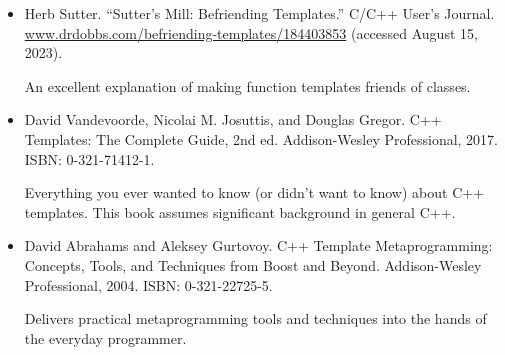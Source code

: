 
\begin{itemize}
\item
Herb Sutter. “Sutter’s Mill: Befriending Templates.” C/C++ User’s Journal. \url{www.drdobbs.com/befriending-templates/184403853} (accessed August 15, 2023).

An excellent explanation of making function templates friends of classes.

\item
David Vandevoorde, Nicolai M. Josuttis, and Douglas Gregor. C++ Templates: The Complete Guide, 2nd ed. Addison-Wesley Professional, 2017. ISBN: 0-321-71412-1.

Everything you ever wanted to know (or didn’t want to know) about C++ templates. This book assumes significant background in general C++.

\item
David Abrahams and Aleksey Gurtovoy. C++ Template Metaprogramming: Concepts, Tools, and Techniques from Boost and Beyond. Addison-Wesley Professional, 2004. ISBN: 0-321-22725-5.

Delivers practical metaprogramming tools and techniques into the hands of the everyday programmer.
\end{itemize}


